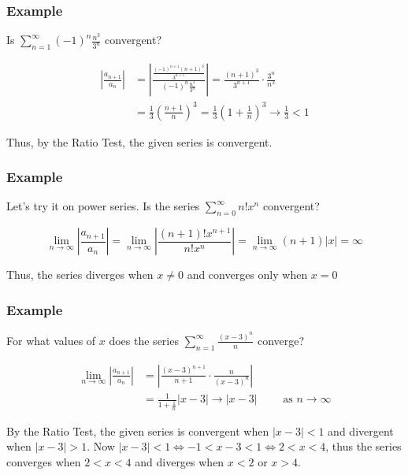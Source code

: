 \documentclass[t]{beamer}
\theoremstyle{plain}
\theoremstyle{definition}
\newcommand{\limm}[1]{\displaystyle \lim_{n\to #1}}
\begin{document}
\begin{frame}

\frametitle{Example}

Is $\displaystyle\sum_{n=1}^{\infty}(-1)^n \frac{n^3}{3^n}$ convergent? \pause

\begin{align*}
\displaystyle\left|\frac{a_{n+1}}{a_n}\right|  &= \left|  \frac{   \frac{(-1)^{n+1}(n + 1)^3}{3^{n + 1}}}{(-1)^n \frac{n^3}{3^n}}  \right| = \frac{(n + 1)^3}{3^{n + 1}} \cdot \frac{3^n}{n^3}\\
&= \frac{1}{3}\left( \frac{n + 1}{n}\right)^3 = \frac{1}{3}\left( 1 + \frac{1}{n} \right)^3 \rightarrow \frac{1}{3} < 1
\end{align*}

Thus, by the Ratio Test, the given series is convergent.

\end{frame}

\begin{frame}
\frametitle{Example}

Let's try it on power series.  Is the series $\displaystyle\sum_{n=0}^{\infty} n!x^n$ convergent? \pause

$$\limm{\infty}\left|\frac{a_{n+1}}{a_n}\right| = \limm{\infty}\left| \frac{(n + 1)!x^{n+1}}{n!x^n}\right| = \limm{\infty}(n + 1) |x| = \infty$$

Thus, the series diverges when $x \neq 0$ and converges only when $x = 0$

\end{frame}

\begin{frame}

\frametitle{Example}

For what values of $x$ does the series $\displaystyle\sum_{n=1}^{\infty}\frac{(x-3)^n}{n}$ converge? \pause

\begin{align*}
\limm{\infty}\left|\frac{a_{n+1}}{a_n}\right| &= \left| \frac{(x-3)^{n + 1}}{n + 1} \cdot \frac{n}{(x - 3)^n}  \right|\\
&= \frac{1}{1 + \frac{1}{n}} |x - 3| \rightarrow |x - 3| \qquad \text{ as } n \rightarrow \infty
\end{align*}

By the Ratio Test, the given series is convergent when $|x - 3| < 1$ and divergent when $|x - 3| > 1$.  Now $|x - 3| < 1 \Leftrightarrow -1 < x - 3 < 1 \Leftrightarrow 2 < x < 4$,  thus the series converges when $2 < x < 4$ and diverges when $x < 2$ or $x > 4$.  

\end{frame}
\end{document}
